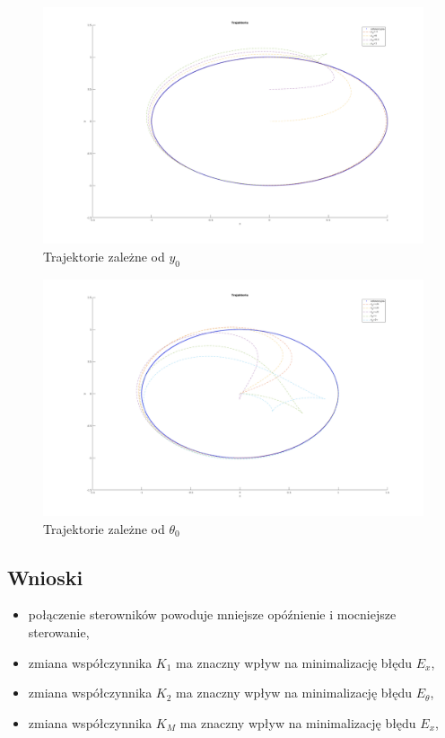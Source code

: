 \documentclass[12pt,a4paper]{article}
\begin{document}
  \begin{figure}[H]
    \centering
    \includegraphics[width=1\textwidth]{figures/wp_y.png}
    \caption{Trajektorie zależne od $y_0$}
    \label{fig:12}
  \end{figure}

  \begin{figure}[H]
    \centering
    \includegraphics[width=1\textwidth]{figures/wp_o.png}
    \caption{Trajektorie zależne od $\theta_0$}
    \label{fig:13}
  \end{figure}


  \subsection{Wnioski}



  \begin{itemize}
    \item połączenie sterowników powoduje mniejsze opóźnienie i mocniejsze sterowanie,
    \item zmiana współczynnika $K_1$ ma znaczny wpływ na minimalizację błędu $E_x$,
    \item zmiana współczynnika $K_2$ ma znaczny wpływ na minimalizację błędu $E_\theta$,
    \item zmiana współczynnika $K_M$ ma znaczny wpływ na minimalizację błędu $E_x$,
  \end{itemize}
  
\end{document}
